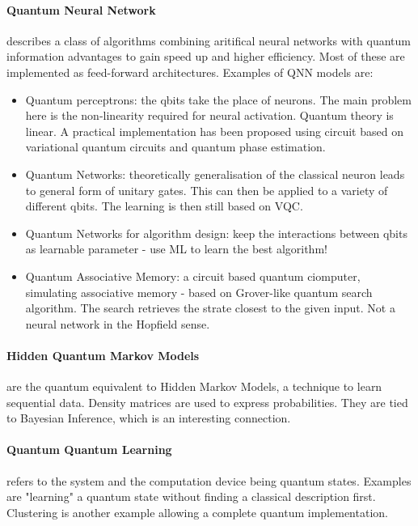 \paragraph{Quantum Neural Network} describes a class of algorithms combining
aritifical neural networks with quantum information advantages to gain speed up
and higher efficiency. Most of these are implemented as feed-forward
architectures.
Examples of QNN models are: 
\begin{itemize}
    \item Quantum perceptrons: the qbits take the place of neurons. The main
    problem here is the non-linearity required for neural activation. Quantum
    theory is linear. A practical implementation has been proposed using circuit
    based on variational quantum circuits and quantum phase estimation.
    \item Quantum Networks: theoretically generalisation of the classical neuron
    leads to general form of unitary gates. This can then be applied to a
    variety of different qbits. The learning is then still based on VQC. 
    \item Quantum Networks for algorithm design: keep the interactions between
    qbits as learnable parameter - use ML to learn the best algorithm!
    \item Quantum Associative Memory: a circuit based quantum ciomputer,
    simulating associative memory - based on Grover-like quantum search
    algorithm. The search retrieves the strate closest to the given input. Not a
    neural network in the Hopfield sense.
\end{itemize}

\paragraph{Hidden Quantum Markov Models} are the quantum equivalent to Hidden
Markov Models, a technique to learn sequential data. Density matrices are used
to express probabilities. They are tied to Bayesian Inference, which is an
interesting connection.

\paragraph{Quantum Quantum Learning} refers to the system and the computation
device being quantum states. Examples are "learning" a quantum state without
finding a classical description first. Clustering is another example allowing a
complete quantum implementation.

